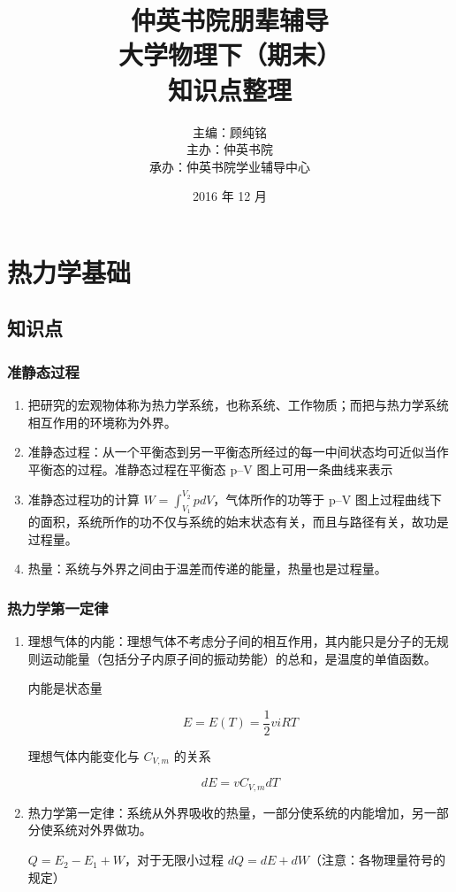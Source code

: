 \documentclass{ctexbook}
\title{仲英书院朋辈辅导 \\ 大学物理下（期末）\\ 知识点整理}
\author{主编：顾纯铭 \\ 主办：仲英书院 \\ 承办：仲英书院学业辅导中心}
\date{2016 年 12 月}
\begin{document}
\maketitle

\tableofcontents

\chapter{热力学基础}

\section{知识点}

\subsection{准静态过程}

\begin{enumerate}
    \item 把研究的宏观物体称为热力学系统，也称系统、工作物质；而把与热力学系统相互作用的环境称为外界。
    \item 准静态过程：从一个平衡态到另一平衡态所经过的每一中间状态均可近似当作平衡态的过程。准静态过程在平衡态 p–V 图上可用一条曲线来表示
    \item 准静态过程功的计算 $ W = \int_{V_1}^{V_2}{pdV} $，气体所作的功等于 p–V 图上过程曲线下的面积，系统所作的功不仅与系统的始末状态有关，而且与路径有关，故功是过程量。
    \item 热量：系统与外界之间由于温差而传递的能量，热量也是过程量。
\end{enumerate}

\subsection{热力学第一定律}

\begin{enumerate}
    \item 理想气体的内能：理想气体不考虑分子间的相互作用，其内能只是分子的无规则运动能量（包括分子内原子间的振动势能）的总和，是温度的单值函数。
    
    内能是状态量 
    
    $$ E = E(T) = \frac{1}{2} v i R T $$
    
    理想气体内能变化与 $ C_{V, m} $ 的关系
    
    $$ dE = v C_{V, m} d T $$
    
    \item  热力学第一定律：系统从外界吸收的热量，一部分使系统的内能增加，另一部分使系统对外界做功。
    
    $ Q = E_2 - E_1 + W $，对于无限小过程 $dQ = dE + dW$（注意：各物理量符号的规定）
    
\end{enumerate}
\end{document}
